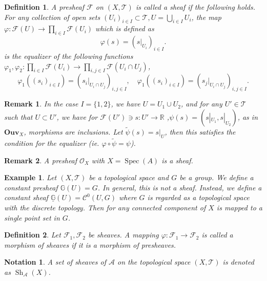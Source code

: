 \documentclass{article}
\newtheorem{definition}{Definition}[section]
\newtheorem{notation}{Notation}[section]
\newtheorem{remark}{Remark}[section]
\newtheorem{example}{Example}[section]
\numberwithin{equation}{section}
\DeclareMathOperator{\Spec}{Spec}
\DeclareMathOperator{\Sh}{Sh}
\begin{document}
\begin{definition}
A presheaf $\mathcal{F}$ on $(X,\mathcal{T})$ is called a sheaf if the following holds.
For any collection of open sets $(U_i)_{i\in I}\subset \mathcal{T},U=\bigcup_{i\in I}U_i$, the map $\varphi:\mathcal{F}(U)\to\prod_{i\in I}\mathcal{F}(U_i)$ which is defined as
\begin{equation*}
\varphi(s) = (s|_{U_i})_{i\in I}.
\end{equation*}
is the equalizer of the following functions $\varphi_1,\varphi_2:\prod_{i\in I}\mathcal{F}(U_i)\to\prod_{i,j\in I}\mathcal{F}(U_i\cap U_j)$, 
\begin{equation*}
\varphi_1((s_i)_{i\in I}) = (s_i|_{U_i\cap U_j})_{i,j\in I},\quad\varphi_1((s_i)_{i\in I}) = (s_j|_{U_i\cap U_j})_{i,j\in I}.
\end{equation*}
\end{definition}

\begin{remark}
In the case $I=\{1,2\}$, we have $U=U_1\cup U_2$, and for any $U'\in\mathcal{T}$ such that $U\subset U'$, we have for $\mathcal{F}(U')\ni s:U'\to\mathbb{R}$ ,$\psi(s) = (s|_{U_1},s|_{U_2})$, as in $\mathbf{Ouv}_X$, morphisms are inclusions. Let $\tilde{\psi}(s) = s|_{U}$, then this satisfies the condition for the equalizer (ie. $\varphi\circ\tilde{\psi}=\psi$). 
\end{remark}

\begin{remark}
A presheaf $\mathcal{O}_X$ with $X=\Spec(A)$ is a sheaf.
\end{remark}

\begin{example}
Let $(X,\mathcal{T})$ be a topological space and $G$ be a group. We define a constant presheaf $\mathbb{G}(U) = G$. In general, this is not a sheaf. Instead, we define a constant sheaf $\underline{\mathbb{G}}(U) = \mathcal{C}^0(U,G)$ where $G$ is regarded as a topological space with the discrete topology. Then for any connected component of $X$ is mapped to a single point set in $G$.
\end{example}

\begin{definition}
Let $\mathcal{F}_1,\mathcal{F}_2$ be sheaves. A mapping $\varphi:\mathcal{F}_1\to\mathcal{F}_2$ is called a morphism of sheaves if it is a morphism of presheaves.
\end{definition}

\begin{notation}
A set of sheaves of $\mathcal{A}$ on the topological space $(X,\mathcal{T})$ is denoted as $\Sh_{\mathcal{A}}(X)$.
\end{notation}
\end{document}
